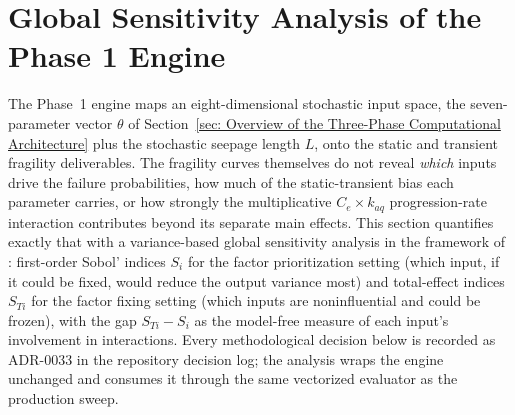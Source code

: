 %

\section{Global Sensitivity Analysis of the Phase 1 Engine}
\label{sec: Global Sensitivity Analysis}

The Phase~1 engine maps an eight-dimensional stochastic input space, the
seven-parameter vector $\theta$ of Section~\ref{sec: Overview of the
Three-Phase Computational Architecture} plus the stochastic seepage length
$L$, onto the static and transient fragility deliverables. The fragility
curves themselves do not reveal \emph{which} inputs drive the failure
probabilities, how much of the static-transient bias each parameter carries,
or how strongly the multiplicative $C_e \times k_{aq}$ progression-rate
interaction contributes beyond its separate main effects. This section
quantifies exactly that with a variance-based global sensitivity analysis in
the framework of \textcite{saltelli_primer_2008}: first-order Sobol' indices
$S_i$ for the factor prioritization setting (which input, if it could be
fixed, would reduce the output variance most) and total-effect indices
$S_{Ti}$ for the factor fixing setting (which inputs are noninfluential and
could be frozen), with the gap $S_{Ti} - S_i$ as the model-free measure of
each input's involvement in interactions. Every methodological decision
below is recorded as ADR-0033 in the repository decision log; the analysis
wraps the engine unchanged and consumes it through the same vectorized
evaluator as the production sweep.

